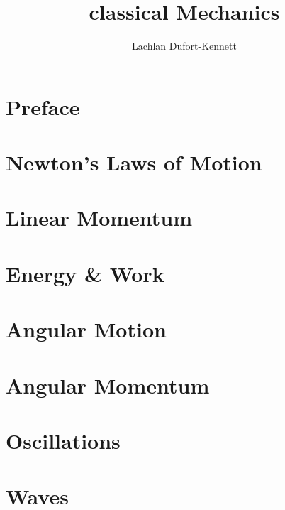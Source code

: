 \documentclass{lecture-notes}
\title{classical Mechanics}
\author{Lachlan Dufort-Kennett}
\begin{document}
    \frontmatter
    \maketitle
    \tableofcontents

    \chapter{Preface}

    \mainmatter
    \chapter{Newton's Laws of Motion}
    
    \chapter{Linear Momentum}
    
    \chapter{Energy \& Work}
    
    \chapter{Angular Motion}
    
    \chapter{Angular Momentum}
    
    \chapter{Oscillations}
    
    \chapter{Waves}
    

    \backmatter
    \nocite{*}
    
    
\end{document}
